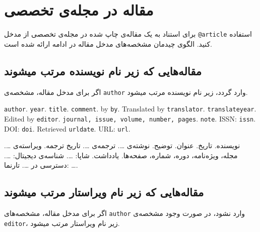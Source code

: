 \documentclass[a4paper,11pt]{article}
\begin{document}
\section{مقاله در مجله‌ی تخصصی}
برای استناد به یک مقاله‌ی چاپ شده در مجله‌ی تخصصی از مدخل \verb|@article| استفاده کنید. الگوی چیدمان مشخصه‌های مدخل مقاله در ادامه ارائه شده است.





\subsection{مقاله‌هایی که زیر نام نویسنده مرتب میشوند}
اگر برای مدخل مقاله، مشخصه‌ی \verb|author| وارد گردد، زیر نام نویسنده مرتب میشود.

\begin{itemize}[nosep]
\begin{latin}
\item[] []
{\tt author}. {\tt year}. {\tt title}. {\tt comment}. by {\tt by}. Translated by {\tt translator}. {\tt translateyear}. Edited by {\tt editor}. {\tt journal, issue, volume, number, pages}. {\tt note}. ISSN: {\tt issn}. DOI: {\tt doi}. Retrieved {\tt urldate}. URL: {\tt url}. 
\end{latin}

\item[] []
{\persianttfamily نویسنده}. {\persianttfamily تاریخ}. {\persianttfamily عنوان}. {\persianttfamily توضیح}. نوشته‌ی {\persianttfamily …}. ترجمه‌ی {\persianttfamily …}. {\persianttfamily تاریخ ترجمه}. ویراسته‌ی {\persianttfamily …}. {\persianttfamily مجله، ویژه‌نامه، دوره، شماره، صفحه‌ها}. {\persianttfamily یادداشت}. شاپا: {\persianttfamily …}. شناسه‌ی دیجیتال: {\persianttfamily …}. دسترسی در {\persianttfamily …}. تارنما: {\persianttfamily …}. 
\end{itemize}





\subsection{مقاله‌هایی که زیر نام ویراستار مرتب میشوند}
اگر برای مدخل مقاله، مشخصه‌های \verb|author| وارد نشود، در صورت وجود مشخصه‌ی \verb|editor|، زیر نام ویراستار مرتب میشود.
\end{document}
